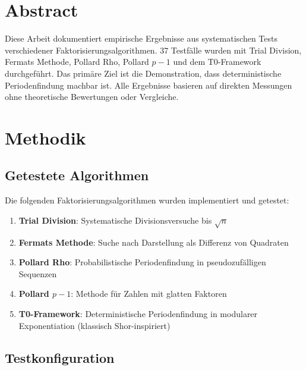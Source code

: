 \section*{Abstract}
		Diese Arbeit dokumentiert empirische Ergebnisse aus systematischen Tests verschiedener Faktorisierungsalgorithmen. 37 Testfälle wurden mit Trial Division, Fermats Methode, Pollard Rho, Pollard $p-1$ und dem T0-Framework durchgeführt. Das primäre Ziel ist die Demonstration, dass deterministische Periodenfindung machbar ist. Alle Ergebnisse basieren auf direkten Messungen ohne theoretische Bewertungen oder Vergleiche.

	
	
	\section{Methodik}
	
	\subsection{Getestete Algorithmen}
	
	Die folgenden Faktorisierungsalgorithmen wurden implementiert und getestet:
	
	\begin{enumerate}
		\item \textbf{Trial Division}: Systematische Divisionsversuche bis $\sqrt{n}$
		\item \textbf{Fermats Methode}: Suche nach Darstellung als Differenz von Quadraten
		\item \textbf{Pollard Rho}: Probabilistische Periodenfindung in pseudozufälligen Sequenzen
		\item \textbf{Pollard $p-1$}: Methode für Zahlen mit glatten Faktoren
		\item \textbf{T0-Framework}: Deterministische Periodenfindung in modularer Exponentiation (klassisch Shor-inspiriert)
	\end{enumerate}
	
	\subsection{Testkonfiguration}
	
	\begin{table}[H]
		\centering
		\caption{Experimentelle Parameter}
		\label{tab:test_config}
	\end{table}
	

